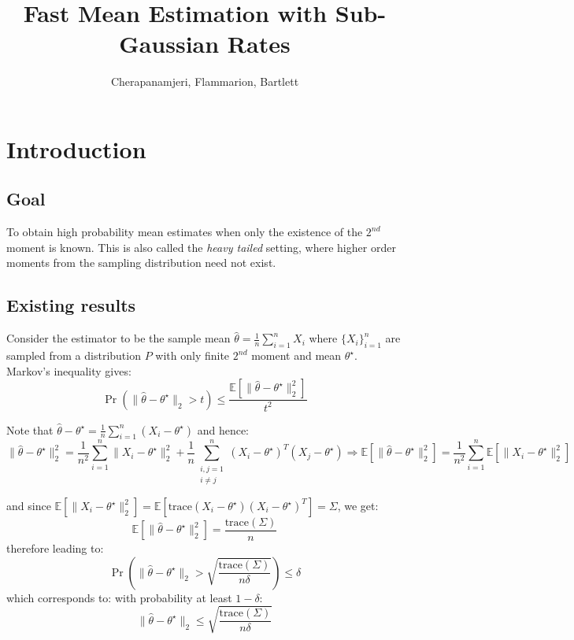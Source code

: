 \documentclass{article}
\title{Fast Mean Estimation with Sub-Gaussian Rates}
\author{Cherapanamjeri, Flammarion, Bartlett}
\date{}
\theoremstyle{remark}
\theoremstyle{defintiion}
\newcommand{\Exp}{\mathbb{E}}
\newcommand{\trace}{\mathrm{trace}}
\newcommand{\eparam}{\widehat{\theta}}
\newcommand{\tparam}{\theta^{\star}}
\begin{document}
\maketitle

\raggedright

\section{Introduction}
\subsection{Goal}
To obtain high probability mean estimates when only the existence of the \(2^{nd}\) moment is known. This is also called the \emph{heavy tailed} setting, where higher order moments from the sampling distribution need not exist.

\subsection{Existing results}
Consider the estimator to be the sample mean \(\eparam = \frac{1}{n}\sum\limits_{i=1}^{n}X_{i}\) where \(\{X_{i}\}_{i=1}^{n}\) are sampled from a distribution \(P\) with only finite \(2^{nd}\) moment and mean \(\tparam\). Markov's inequality gives:
\begin{equation*}
\Pr(\|\eparam - \tparam\|_{2} > t) \leq \frac{\Exp[\|\eparam - \tparam\|^{2}_{2}]}{t^{2}}
\end{equation*}

Note that \(\eparam - \tparam = \frac{1}{n}\sum\limits_{i=1}^{n}(X_{i} - \tparam)\) and hence:
\begin{equation*}
\|\eparam - \tparam\|_{2}^{2} = \frac{1}{n^{2}}\sum_{i=1}^{n} \|X_{i} - \tparam\|_{2}^{2} + \frac{1}{n}\sum_{\substack{i, j = 1 \\ i \neq j}}^{n} (X_{i} - \tparam)^{T}(X_{j} - \tparam) \Rightarrow \Exp[\|\eparam - \tparam\|_{2}^{2}] = \frac{1}{n^{2}}\sum_{i=1}^{n} \Exp\left[\|X_{i} - \tparam\|_{2}^{2}\right]
\end{equation*}

and since \(\Exp\left[\|X_{i} - \tparam\|_{2}^{2}\right] = \Exp\left[\trace(X_{i} - \tparam)(X_{i} - \tparam)^{T}\right] = \Sigma\), we get:
\begin{equation*}
\Exp[\|\eparam - \tparam\|_{2}^{2}] = \frac{\trace(\Sigma)}{n}
\end{equation*}
therefore leading to:
\begin{equation*}
\Pr\left(\|\eparam - \tparam\|_{2} > \sqrt{\frac{\trace(\Sigma)}{n\delta}}\right) \leq \delta
\end{equation*}
which corresponds to: with probability at least \(1 - \delta\):
\begin{equation*}
\|\eparam - \tparam\|_{2} \leq \sqrt{\frac{\trace(\Sigma)}{n\delta}}
\end{equation*}
\end{document}
